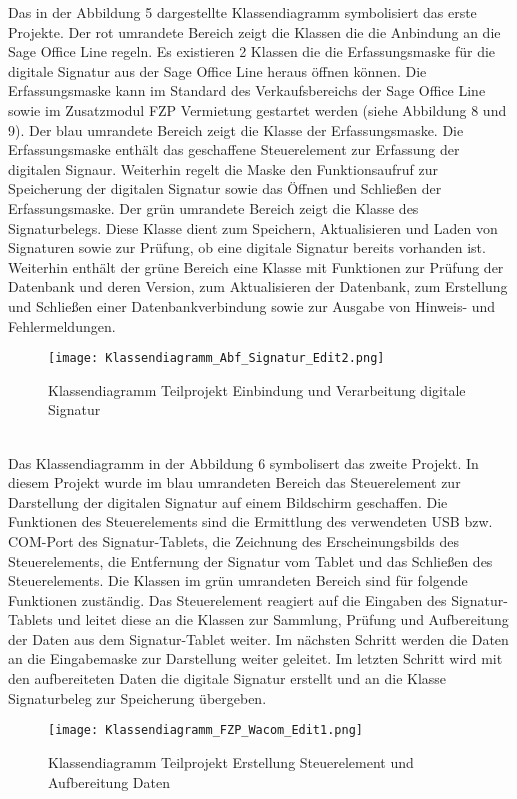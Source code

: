 Das in der Abbildung 5 dargestellte Klassendiagramm symbolisiert das erste Projekte. Der rot umrandete Bereich zeigt die Klassen die die Anbindung an die Sage Office Line regeln. Es existieren 2 Klassen die die Erfassungsmaske für die digitale Signatur aus der Sage Office Line heraus öffnen können. Die Erfassungsmaske kann im Standard des Verkaufsbereichs der Sage Office Line sowie im Zusatzmodul FZP Vermietung gestartet werden (siehe Abbildung 8 und 9). Der blau umrandete Bereich zeigt die Klasse der Erfassungsmaske. Die Erfassungsmaske enthält das geschaffene Steuerelement zur Erfassung der digitalen Signaur. Weiterhin regelt die Maske den Funktionsaufruf zur Speicherung der digitalen Signatur sowie das Öffnen und Schließen der Erfassungsmaske. Der grün umrandete Bereich zeigt die Klasse des Signaturbelegs. Diese Klasse dient zum Speichern, Aktualisieren und Laden von Signaturen sowie zur Prüfung, ob eine digitale Signatur bereits vorhanden ist. Weiterhin enthält der grüne Bereich eine Klasse mit Funktionen zur Prüfung der Datenbank und deren Version, zum Aktualisieren der Datenbank, zum Erstellung und Schließen einer Datenbankverbindung sowie zur Ausgabe von Hinweis- und Fehlermeldungen.
\begin{figure}[!ht]
    \centering
    \texttt{[image: Klassendiagramm\_Abf\_Signatur\_Edit2.png]}
    \caption[Klassendiagramm Einbindung und Verarbeitung digitale Signatur]{\small{Klassendiagramm Teilprojekt Einbindung und Verarbeitung digitale Signatur}}
\end{figure}\\
Das Klassendiagramm in der Abbildung 6 symbolisert das zweite Projekt. In diesem Projekt wurde im blau umrandeten Bereich das Steuerelement zur Darstellung der digitalen Signatur auf einem Bildschirm geschaffen. Die Funktionen des Steuerelements sind die Ermittlung des verwendeten USB bzw. COM-Port des Signatur-Tablets, die Zeichnung des Erscheinungsbilds des Steuerelements, die Entfernung der Signatur vom Tablet und das Schließen des Steuerelements. Die Klassen im grün umrandeten Bereich sind für folgende Funktionen zuständig. Das Steuerelement reagiert auf die Eingaben des Signatur-Tablets und leitet diese an die Klassen zur Sammlung, Prüfung und Aufbereitung der Daten aus dem Signatur-Tablet weiter. Im nächsten Schritt werden die Daten an die Eingabemaske zur Darstellung weiter geleitet. Im letzten Schritt wird mit den aufbereiteten Daten die digitale Signatur erstellt und an die Klasse Signaturbeleg zur Speicherung übergeben.
\begin{figure}[!ht]
    \centering
    \texttt{[image: Klassendiagramm\_FZP\_Wacom\_Edit1.png]}
    \caption[Klassendiagramm Erstellung Steuerelement und Aufbereitung Daten]{\small{Klassendiagramm Teilprojekt Erstellung Steuerelement und Aufbereitung Daten}}
\end{figure}\\
